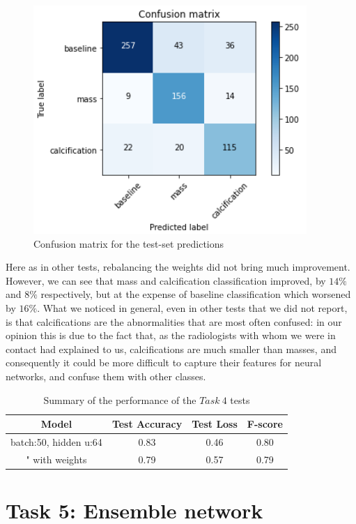 \documentclass[11pt,a4paper,oneside]{article}
\begin{document}
\begin{figure}[h]
\begin{minipage}[c]{.4\textwidth}
		\label{fig:4_acc_w}
	\end{minipage}
	\hspace{5mm}%
	\begin{minipage}[c]{.4\textwidth}
		\centering\setlength{\captionmargin}{0pt}%
		\includegraphics[width=.9\textwidth]{images/4.1/2_matrix}
		\caption{Confusion matrix for the test-set predictions}
		\label{fig:4_matrix_w}
	\end{minipage}%
\end{figure}

Here as in other tests, rebalancing the weights did not bring much improvement. However, we can see that mass and calcification classification improved, by $14\%$ and $8\%$ respectively, but at the expense of baseline classification which worsened by $16\%$. What we noticed in general, even in other tests that we did not report, is that calcifications are the abnormalities that are most often confused: in our opinion this is due to the fact that, as the radiologists with whom we were in contact had explained to us, calcifications are much smaller than masses, and consequently it could be more difficult to capture their features for neural networks, and confuse them with other classes.

\begin{table}
\centering
	\begin{tabular}{|cccc|}
	\hline
	Model & Test Accuracy & Test Loss & F-score \\
	\hline
	batch:50, hidden u:64 & 0.83 & 0.46 & 0.80 \\
	"    with weights & 0.79 & 0.57 & 0.79 \\
	\hline
	\end{tabular}
\caption{Summary of the performance of the $Task\ 4$ tests}
\end{table}

\clearpage

\section{Task 5: Ensemble network}
\end{document}
